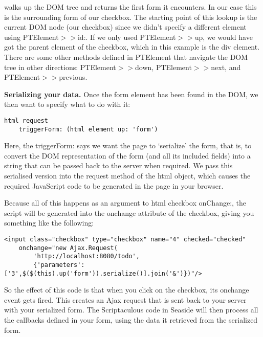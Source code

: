 \documentclass[a4paper,10pt,twoside]{book}
\newcommand{\ct}[1]{{\small\ttfamily\textup{#1}}}
\begin{document}
walks up the DOM tree and returns the first form it encounters. In our case this is the surrounding form of our checkbox. The starting point of this lookup is the current DOM node (our checkbox) since we didn't specify a different element using  \ct{PTElement$>$$>$id:}. If we only used  \ct{PTElement$>$$>$up}, we would have got the parent element of the checkbox, which in this example is the div element. There are some other methods defined in  \ct{PTElement} that navigate the DOM tree in other directions:  \ct{PTElement$>$$>$down},  \ct{PTElement$>$$>$next}, and  \ct{PTElement$>$$>$previous}.

\textbf{Serializing your data.} Once the form element has been found in the DOM, we then want to specify what to do with it:

\begin{lstlisting}
html request
    triggerForm: (html element up: 'form')
\end{lstlisting}

Here, the \ct{triggerForm:} says we want the page to `serialize' the form, that is, to convert the DOM representation of the form (and all its included fields) into a string that can be passed back to the server when required. We pass this serialised version into the \ct{request} method of the \ct{html} object, which causes the required JavaScript code to be generated in the page in your browser.

Because all of this happens as an argument to \ct{html checkbox onChange:}, the script will be generated into the \ct{onchange} attribute of the checkbox, giving you something like the following:

\begin{lstlisting}
<input class="checkbox" type="checkbox" name="4" checked="checked" 
    onchange="new Ajax.Request(
        'http://localhost:8080/todo',
        {'parameters':['3',$($(this).up('form')).serialize()].join('&')})"/>
\end{lstlisting}

So the effect of this code is that when you click on the checkbox, its \ct{onchange} event gets fired. This creates an Ajax request that is sent back to your server with your serialized form. The Scriptaculous code in Seaside will then process all the callbacks defined in your form, using the data it retrieved from the serialized form. 
\end{document}
